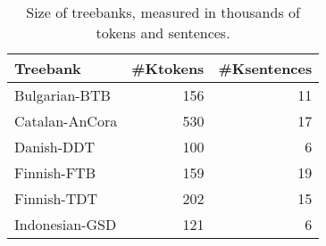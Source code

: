 \begin{table}[t!]
    \centering\small
    \begin{tabular}{lrr}\toprule
        Treebank       & \multicolumn{1}{l}{\#Ktokens} & \multicolumn{1}{l}{\#Ksentences} \\ \midrule
        Bulgarian-BTB  & 156                           & 11                               \\
        Catalan-AnCora & 530                           & 17                               \\
        Danish-DDT     & 100                           & 6                                \\
        Finnish-FTB    & 159                           & 19                               \\
        Finnish-TDT    & 202                           & 15                               \\
        Indonesian-GSD & 121                           & 6                                \\
        \bottomrule
    \end{tabular}
    \caption{Size of treebanks, measured in thousands of tokens and sentences.}
    \label{tab:treeb}
\end{table}

